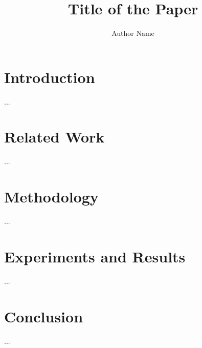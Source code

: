 \documentclass[sigconf]{acmart}
\title{Title of the Paper}
\author{Author Name}
\affiliation{
  \institution{University / Company}
  \city{City}
  \country{Country}
}
\begin{document}
\maketitle

\section{Introduction}
...

\section{Related Work}
...

\section{Methodology}
...

\section{Experiments and Results}
...

\section{Conclusion}
...



\end{document}
